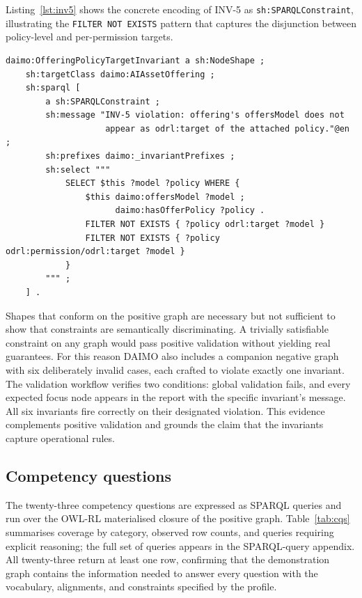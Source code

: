 \documentclass[Afour,sagev,times]{sagej}
\newcommand{\code}[1]{\texttt{#1}}
\begin{document}
Listing~\ref{lst:inv5} shows the concrete encoding of INV-5 as \code{sh:SPARQLConstraint}, illustrating the \code{FILTER NOT EXISTS} pattern that captures the disjunction between policy-level and per-permission targets.

\begin{lstlisting}[label=lst:inv5,caption={INV-5 encoded as a \code{sh:SPARQLConstraint}.}]
daimo:OfferingPolicyTargetInvariant a sh:NodeShape ;
    sh:targetClass daimo:AIAssetOffering ;
    sh:sparql [
        a sh:SPARQLConstraint ;
        sh:message "INV-5 violation: offering's offersModel does not
                    appear as odrl:target of the attached policy."@en ;
        sh:prefixes daimo:_invariantPrefixes ;
        sh:select """
            SELECT $this ?model ?policy WHERE {
                $this daimo:offersModel ?model ;
                      daimo:hasOfferPolicy ?policy .
                FILTER NOT EXISTS { ?policy odrl:target ?model }
                FILTER NOT EXISTS { ?policy odrl:permission/odrl:target ?model }
            }
        """ ;
    ] .
\end{lstlisting}

Shapes that conform on the positive graph are necessary but not sufficient to show that constraints are semantically discriminating. A trivially satisfiable constraint on any graph would pass positive validation without yielding real guarantees. For this reason DAIMO also includes a companion negative graph with six deliberately invalid cases, each crafted to violate exactly one invariant. The validation workflow verifies two conditions: global validation fails, and every expected focus node appears in the report with the specific invariant's message. All six invariants fire correctly on their designated violation. This evidence complements positive validation and grounds the claim that the invariants capture operational rules.

\subsection{Competency questions}\label{sec:eval-cqs}

The twenty-three competency questions are expressed as SPARQL queries and run over the OWL-RL materialised closure of the positive graph. Table~\ref{tab:cqs} summarises coverage by category, observed row counts, and queries requiring explicit reasoning; the full set of queries appears in the SPARQL-query appendix. All twenty-three return at least one row, confirming that the demonstration graph contains the information needed to answer every question with the vocabulary, alignments, and constraints specified by the profile.
\end{document}
